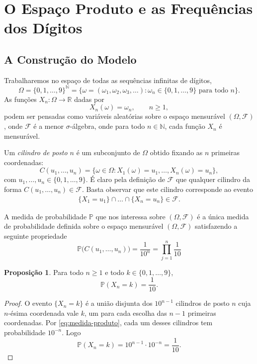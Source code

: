 \documentclass[12pt,portuguese]{article}
\theoremstyle{definition}
\newtheorem{proposition}[proposition]{Proposição}
\theoremstyle{plainexercise}
\theoremstyle{starredexercise}
\theoremstyle{definition}
\begin{document}
\section{O Espaço Produto e as Frequências dos Dígitos}\label{sec:espaco-produto}

\subsection{A Construção do Modelo}\label{subsec:modelo}

Trabalharemos no espaço de todas as sequências infinitas de dígitos,
\[
\Omega=\{0,1,\ldots,9\}^{\mathbb{N}}
=
\bigl\{\omega=(\omega_1,\omega_2,\omega_3,\ldots):
\omega_n\in\{0,1,\ldots,9\}\text{ para todo }n\bigr\}.
\]
As funções $X_n:\Omega\to \mathbb{R}$ dadas por 
\[
X_n(\omega)=\omega_n,
\qquad n\geqslant1,
\]
podem ser pensadas como variáveis aleatórias sobre o espaço mensurável $(\Omega,\mathcal{F})$, 
onde $\mathcal{F}$ é a menor $\sigma$-álgebra, onde para todo $n\in\mathbb{N}$, 
cada função $X_n$ é mensurável. 


Um \emph{cilindro de posto $n$} é um subconjunto de $\Omega$ obtido fixando as $n$ primeiras
coordenadas:
\[
C(u_1,\ldots,u_n)
=
\bigl\{\omega\in\Omega:X_1(\omega)=u_1,\ldots,X_n(\omega)=u_n\bigr\},
\]
com $u_1,\ldots,u_n\in\{0,1,\ldots,9\}$. É claro pela definição de $\mathcal{F}$
que qualquer cilindro da forma $C(u_1,\ldots,u_n)\in \mathcal{F}$. Basta
observar que este cilindro corresponde ao evento 
\begin{align*}
\{X_1=u_1\}\cap \ldots\cap \{X_n=u_n\}\in\mathcal{F}.
\end{align*}

A medida de probabilidade $\mathbb{P}$ que nos interessa sobre $(\Omega,\mathcal{F})$ 
é a única medida de probabilidade definida sobre o espaço mensurável $(\Omega,\mathcal{F})$ 
satisfazendo a seguinte propriedade
\begin{equation}\label{eq:medida-produto}
\mathbb{P}\bigl(C(u_1,\ldots,u_n)\bigr)=\frac{1}{10^n}
=
\prod_{j=1}^{n}\frac{1}{10}
\end{equation}

\begin{proposition}\label{prop:marginais}
Para todo $n\geqslant1$ e todo $k\in\{0,1,\ldots,9\}$,
\[
\mathbb{P}(X_n=k)=\frac{1}{10}.
\]
\end{proposition}

\begin{proof}
O evento $\{X_n=k\}$ é a união disjunta dos $10^{n-1}$ cilindros de posto $n$
cuja $n$-ésima coordenada vale $k$, um para cada escolha das $n-1$ primeiras
coordenadas. Por \eqref{eq:medida-produto}, cada um desses cilindros tem
probabilidade $10^{-n}$. Logo
\[
\mathbb{P}(X_n=k)=10^{n-1}\cdot10^{-n}=\frac{1}{10}.
\]
\end{proof}
\end{document}
